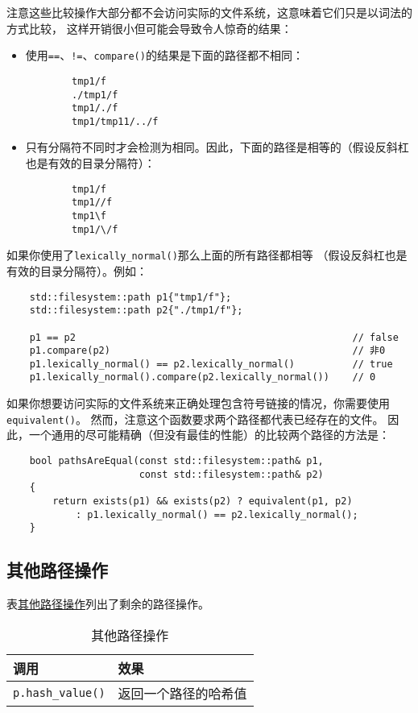 注意这些比较操作大部分都不会访问实际的文件系统，这意味着它们只是以词法的方式比较，
这样开销很小但可能会导致令人惊奇的结果：
\begin{itemize}
    \item 使用\texttt{==}、\texttt{!=}、\texttt{compare()}的结果是下面的路径都不相同：
    \begin{lstlisting}
        tmp1/f
        ./tmp1/f
        tmp1/./f
        tmp1/tmp11/../f
    \end{lstlisting}
    \item 只有分隔符不同时才会检测为相同。因此，下面的路径是相等的（假设反斜杠也是有效的目录分隔符）：
    \begin{lstlisting}
        tmp1/f
        tmp1//f
        tmp1\f
        tmp1/\/f
    \end{lstlisting}
\end{itemize}
如果你使用了\texttt{lexically\_normal()}那么上面的所有路径都相等
（假设反斜杠也是有效的目录分隔符）。例如：
\begin{lstlisting}
    std::filesystem::path p1{"tmp1/f"};
    std::filesystem::path p2{"./tmp1/f"};

    p1 == p2                                                // false
    p1.compare(p2)                                          // 非0
    p1.lexically_normal() == p2.lexically_normal()          // true
    p1.lexically_normal().compare(p2.lexically_normal())    // 0
\end{lstlisting}
如果你想要访问实际的文件系统来正确处理包含符号链接的情况，你需要使用\texttt{equivalent()}。
然而，注意这个函数要求两个路径都代表已经存在的文件。
因此，一个通用的尽可能精确（但没有最佳的性能）的比较两个路径的方法是：
\begin{lstlisting}
    bool pathsAreEqual(const std::filesystem::path& p1,
                       const std::filesystem::path& p2)
    {
        return exists(p1) && exists(p2) ? equivalent(p1, p2)
            : p1.lexically_normal() == p2.lexically_normal();
    }
\end{lstlisting}

\subsection{其他路径操作}
表\hyperref[t20.9]{其他路径操作}列出了剩余的路径操作。
\begin{table}[ht]
    \centering
    \begin{tabular}{l|l}
        \hline
        \textbf{调用}              & \textbf{效果} \\
        \hline
        \texttt{p.hash\_value()} & 返回一个路径的哈希值  \\
        \hline
    \end{tabular}
    \caption{其他路径操作}
    \label{t20.9}
\end{table}


